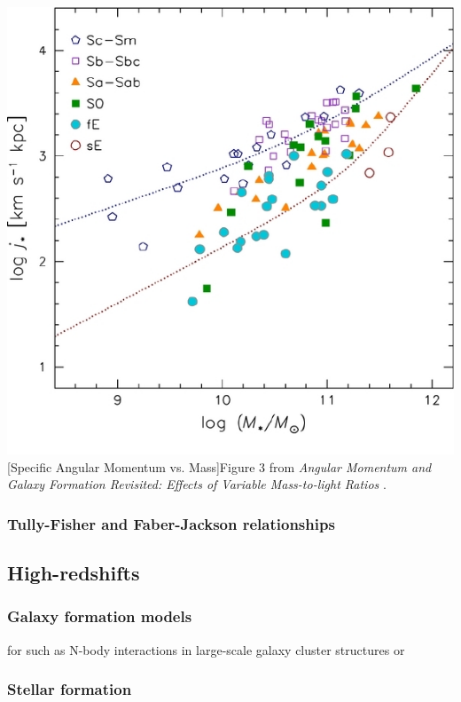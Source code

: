 \documentclass[12pt, twocolumn]{revtex4}    %
\begin{document}
\begin{center}
\includegraphics[width=1.0\linewidth]{introduction/romanowsky_2012_fig_3}
[Specific Angular Momentum vs. Mass]{Figure 3 from \textit{Angular Momentum and Galaxy Formation Revisited: Effects of Variable Mass-to-light Ratios} \citep{2012ApJS..203...17R}. }
\label{fig:romanowsky_2012_fig_3}
\end{center} 


\subsubsection{Tully-Fisher and Faber-Jackson relationships}

\subsection{High-redshifts}

\subsubsection{Galaxy formation models}

for such as N-body interactions in large-scale galaxy cluster structures or 

\subsubsection{Stellar formation}
\end{document}

